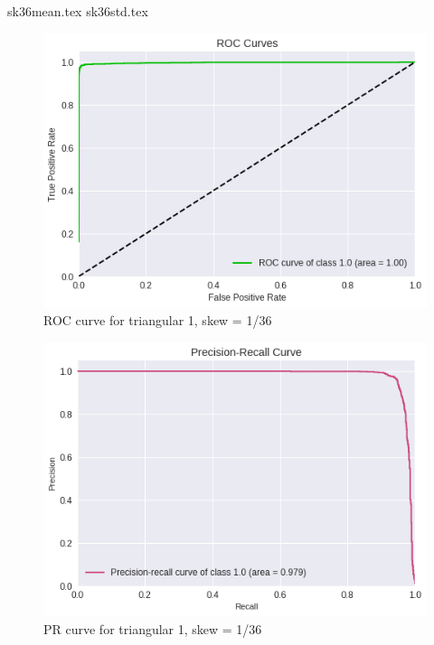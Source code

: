 \documentclass[journal, a4paper]{IEEEtran}
\begin{document}
{sk36mean.tex}
{sk36std.tex}
\begin{figure}[h]
\includegraphics[scale=0.45]{images/skew36/triangular1/roc_triang_test.png}
\caption{ROC curve for triangular 1, skew = 1/36}
\label{fig:triang1_roc_test}
\end{figure}
\begin{figure}[h!]
\includegraphics[scale=0.45]{images/skew36/triangular1/PR_triang_test.png}
\caption{PR curve for triangular 1, skew = 1/36}
\label{fig:triang1_pr_test}
\end{figure}
\end{document}

